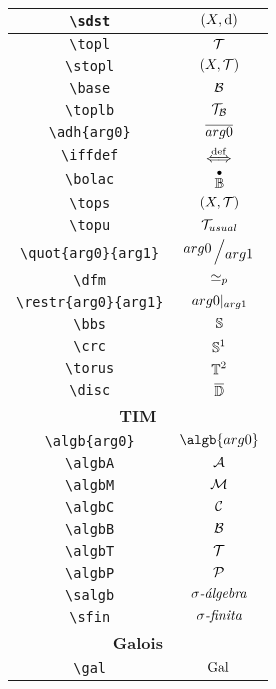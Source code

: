 \begin{longtable}{|c|c|}
\verb|\sdst| & $\displaystyle(X,\operatorname{d})$ \\ \hline 
\verb|\topl| & $\displaystyle\mathcal{T}$ \\ \hline 
\verb|\stopl| & $\displaystyle(X, \mathcal{T})$ \\ \hline 
\verb|\base| & $\displaystyle\mathcal{B}$ \\ \hline 
\verb|\toplb| & $\displaystyle\mathcal{T}_{\mathcal{B}}$ \\ \hline 
\verb|\adh{arg0}| & $\displaystyle\overline{arg0}$ \\ \hline 
\verb|\iffdef| & $\displaystyle\overset{\mathrm{def}}{\iff}$ \\ \hline 
\verb|\bolac| & $\displaystyle\overset{\bullet}{\mathbb{B}}$ \\ \hline 
\verb|\tops| & $\displaystyle(X, \mathcal{T})$ \\ \hline 
\verb|\topu| & $\displaystyle\mathcal{T}_{usual}$ \\ \hline 
\verb|\quot{arg0}{arg1}| & $\displaystyle\quot{arg0}{arg1}$ \\ \hline 
\verb|\dfm| & $\displaystyle\simeq_p$ \\ \hline 
\verb|\restr{arg0}{arg1}| & $\displaystyle{arg0}|_{arg1}$ \\ \hline 
\verb|\bbs| & $\displaystyle\mathbb{S}$ \\ \hline 
\verb|\crc| & $\displaystyle\mathbb{S}^1$ \\ \hline 
\verb|\torus| & $\displaystyle\mathbb{T}^2$ \\ \hline 
\verb|\disc| & $\displaystyle\overline{\mathbb{D}}$ \\ \hline 
\multicolumn{2}{|c|}{\textbf{TIM}} \\ \hline 
\verb|\algb{arg0}| & $\displaystyle\algb{arg0}$ \\ \hline 
\verb|\algbA| & $\displaystyle\mathcal{A}$ \\ \hline 
\verb|\algbM| & $\displaystyle\mathcal{M}$ \\ \hline 
\verb|\algbC| & $\displaystyle\mathcal{C}$ \\ \hline 
\verb|\algbB| & $\displaystyle\mathcal{B}$ \\ \hline 
\verb|\algbT| & $\displaystyle\mathcal{T}$ \\ \hline 
\verb|\algbP| & $\displaystyle\mathcal{P}$ \\ \hline 
\verb|\salgb| & $\displaystyle\sigma \textit{-\'{a}lgebra}$ \\ \hline 
\verb|\sfin| & $\displaystyle\sigma \textit{-finita}$ \\ \hline 
\multicolumn{2}{|c|}{\textbf{Galois}} \\ \hline 
\verb|\gal| & $\displaystyle\mathrm{Gal}\,$ \\ \hline 
\end{longtable}